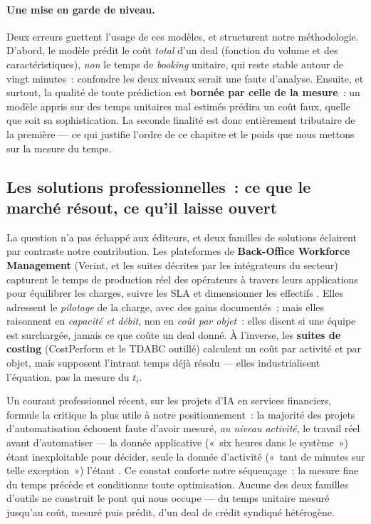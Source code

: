 \paragraph{Une mise en garde de niveau.}
Deux erreurs guettent l'usage de ces modèles, et structurent notre méthodologie.
D'abord, le modèle prédit le coût \emph{total} d'un deal (fonction du volume et des
caractéristiques), \emph{non} le temps de \textit{booking} unitaire, qui reste stable
autour de vingt minutes~: confondre les deux niveaux serait une faute d'analyse. Ensuite,
et surtout, la qualité de toute prédiction est \textbf{bornée par celle de la mesure}~:
un modèle appris sur des temps unitaires mal estimés prédira un coût faux, quelle que
soit sa sophistication. La seconde finalité est donc entièrement tributaire de la
première --- ce qui justifie l'ordre de ce chapitre et le poids que nous mettons sur la
mesure du temps.

\subsection{Les solutions professionnelles~: ce que le marché résout, ce qu'il laisse ouvert}
\label{sec:solutions-marche}

La question n'a pas échappé aux éditeurs, et deux familles de solutions éclairent par
contraste notre contribution. Les plateformes de \textbf{Back-Office Workforce
Management} (Verint, et les suites décrites par les intégrateurs du secteur) capturent le
temps de production réel des opérateurs à travers leurs applications pour équilibrer les
charges, suivre les SLA et dimensionner les effectifs \cite{verint}. Elles adressent le
\emph{pilotage} de la charge, avec des gains documentés~; mais elles raisonnent en
\emph{capacité et débit}, non en \emph{coût par objet}~: elles disent si une équipe est
surchargée, jamais ce que coûte un deal donné. À l'inverse, les \textbf{suites de
costing} (CostPerform et le TDABC outillé) calculent un coût par activité et par objet,
mais supposent l'intrant temps déjà résolu --- elles industrialisent l'équation, pas la
mesure du $t_i$.

Un courant professionnel récent, sur les projets d'IA en services financiers, formule la
critique la plus utile à notre positionnement~: la majorité des projets d'automatisation
échouent faute d'avoir mesuré, \emph{au niveau activité}, le travail réel avant
d'automatiser --- la donnée applicative («~six heures dans le système~») étant
inexploitable pour décider, seule la donnée d'activité («~tant de minutes sur telle
exception~») l'étant \cite{summittrails}. Ce constat conforte notre séquençage~: la
mesure fine du temps précède et conditionne toute optimisation. Aucune des deux familles
d'outils ne construit le pont qui nous occupe --- du temps unitaire mesuré jusqu'au coût,
mesuré puis prédit, d'un deal de crédit syndiqué hétérogène.

